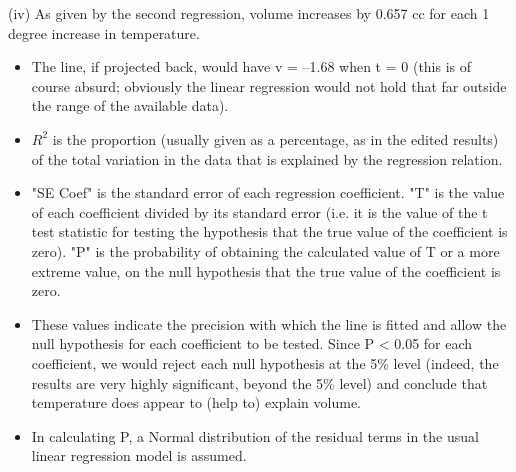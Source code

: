 \documentclass[a4paper,12pt]{article}
\begin{document}
(iv) As given by the second regression, volume increases by 0.657 cc for each 1 degree increase in temperature.  
\begin{itemize} 
\item The line, if projected back, would have v = –1.68 when t = 0 (this is of course absurd;  obviously the linear regression would not hold that far outside the range of the available data). 
\item $R^2$ is the proportion (usually given as a percentage, as in the edited results) of the total variation in the data that is explained by the regression relation. 

    \item "SE Coef" is the standard error of each regression coefficient.  "T" is the value of each coefficient divided by its standard error (i.e. it is the value of the t test statistic for testing the hypothesis that the true value of the coefficient is zero).  "P" is the probability of obtaining the calculated value of T or a more extreme value, on the null hypothesis that the true value of the coefficient is zero. 
 
\item These values indicate the precision with which the line is fitted and allow the null hypothesis for each coefficient to be tested.  Since P < 0.05 for each coefficient, we would reject each null hypothesis at the 5\% level (indeed, the results are very highly significant, beyond the 5\% level) and conclude that temperature does appear to (help to) explain volume. 


 
\item In calculating P, a Normal distribution of the residual terms in the usual linear regression model is assumed. 
 \end{itemize} 
\end{document}
